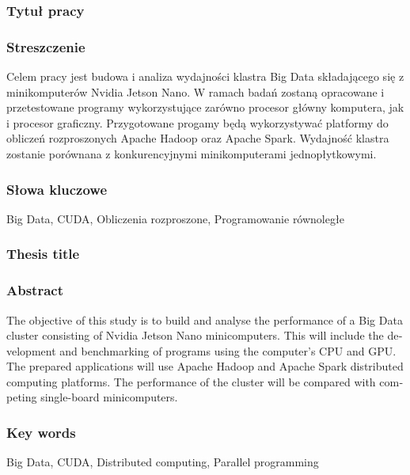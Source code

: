 \subsubsection*{Tytuł pracy}
\Title

\subsubsection*{Streszczenie}
Celem pracy jest budowa i analiza wydajności klastra Big Data składającego się z
minikomputerów Nvidia Jetson Nano. W ramach badań zostaną opracowane i przetestowane
programy wykorzystujące zarówno procesor główny komputera, jak i procesor graficzny.
Przygotowane progamy będą wykorzystywać platformy do obliczeń rozproszonych Apache Hadoop
oraz Apache Spark. Wydajność klastra zostanie porównana z konkurencyjnymi minikomputerami
jednopłytkowymi.

\subsubsection*{Słowa kluczowe}
Big Data, CUDA, Obliczenia rozproszone, Programowanie równoległe

\subsubsection*{Thesis title}
\begin{otherlanguage}{british}
    \TitleAlt
\end{otherlanguage}

\subsubsection*{Abstract}
\begin{otherlanguage}{british}
    The objective of this study is to build and analyse the performance of a Big Data
    cluster consisting of Nvidia Jetson Nano minicomputers. This will include the development
    and benchmarking of programs using the computer's CPU and GPU. The prepared applications
    will use Apache Hadoop and Apache Spark distributed computing platforms. The performance
    of the cluster will be compared with competing single-board minicomputers.
\end{otherlanguage}

\subsubsection*{Key words}
\begin{otherlanguage}{british}
    Big Data, CUDA, Distributed computing, Parallel programming
\end{otherlanguage}
